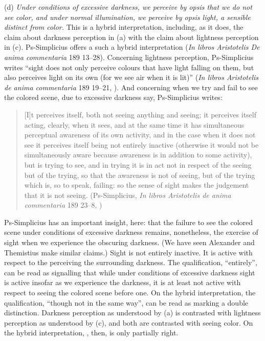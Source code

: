 (d) \emph{Under conditions of excessive darkness, we perceive by \emph{opsis} that we do not see color, and under normal illumination, we perceive by \emph{opsis} light, a sensible distinct from color.} This is a hybrid interpretation, including, as it does, the claim about darkness perception in (a) with the claim about lightness perception in (c). Ps-Simplicius offers a such a hybrid interpretation (\emph{In libros Aristotelis De anima commentaria} 189 13–28). Concerning lightness perception, Ps-Simplicius writes ``sight does not only perceive colours that have light falling on them, but also perceives light on its own (for we see air when it is lit)'' (\emph{In libros Aristotelis de anima commentaria} 189 19–21, \citealt[42]{Blumenthal:2000rf}). And concerning when we try and fail to see the colored scene, due to excessive darkness say, Ps-Simplicius writes:
\begin{quote}
	[I]t perceives itself, both not seeing anything and seeing; it perceives itself acting, clearly, when it sees, and at the same time it has simultaneous perceptual awareness of its own activity, and in the case when it does not see it perceives itself being not entirely inactive (otherwise it would not be simultaneously aware because awareness is in addition to some activity), but is trying to see, and in trying it is in act not in respect of the seeing but of the trying, so that the awareness is not of seeing, but of the trying which is, so to speak, failing: so the sense of sight makes the judgement that it is not seeing. (Ps-Simplicius, \emph{In libros Aristotelis de anima commentaria} 189 23–8, \citealt[42]{Blumenthal:2000rf})
\end{quote}
Ps-Simplicius has an important insight, here: that the failure to see the colored scene under conditions of excessive darkness remains, nonetheless, the exercise of sight when we experience the obscuring darkness. (We have seen Alexander and Themistius make similar claims.) Sight is not entirely inactive. It is active with respect to the perceiving the surrounding darkness. The qualification, ``entirely'', can be read as signalling that while under conditions of excessive darkness sight is active insofar as we experience the darkness, it is at least not active with respect to seeing the colored scene before one. On the hybrid interpretation, the qualification, ``though not in the same way'', can be read as marking a double distinction. Darkness perception as understood by (a) is contrasted with lightness perception as understood by (c), and both are contrasted with seeing color. On the hybrid interpretation, \citet[275]{Ross:1961uq}, then, is only partially right.

